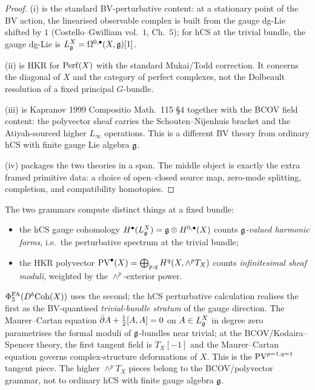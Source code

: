 \begin{proof}
(i) is the standard BV-perturbative content: at a stationary point of
the BV action, the linearised observable complex is built from the
gauge dg-Lie shifted by $1$
(Costello--Gwilliam vol.\ $1$, Ch.\ $5$); for hCS at the trivial
bundle, the gauge dg-Lie is $L_{\mathfrak{g}}^X = \Omega^{0,\bullet}(X,\mathfrak{g})[1]$.

(ii) is HKR for $\mathrm{Perf}(X)$ with the standard Mukai/Todd correction. It
concerns the diagonal of $X$ and the category of perfect complexes, not
the Dolbeault resolution of a fixed principal $G$-bundle.

(iii) is Kapranov 1999 Compositio Math.\ 115 \S$4$ together with the
BCOV field content: the polyvector sheaf carries the
Schouten--Nijenhuis bracket and the Atiyah-sourced higher
$L_\infty$ operations. This is a different BV theory from ordinary hCS
with finite gauge Lie algebra $\mathfrak{g}$.

(iv) packages the two theories in a span. The middle object is exactly
the extra framed primitive data: a choice of open--closed source map,
zero-mode splitting, completion, and compatibility homotopies.
\end{proof}

\begin{remark}
\label{rem:two-grammars-scopes}
The two grammars compute distinct things at a fixed bundle:
\begin{itemize}
\item the hCS gauge cohomology $H^\bullet(L_{\mathfrak{g}}^X) = \mathfrak{g}\otimes
 H^{0,\bullet}(X)$ counts \emph{$\mathfrak{g}$-valued harmonic forms},
 i.e.\ the perturbative spectrum at the trivial bundle;
\item the HKR polyvector $\mathrm{PV}^\bullet(X) = \bigoplus_{p,q}
 H^q(X,\wedge^p T_X)$ counts \emph{infinitesimal sheaf moduli},
 weighted by the $\wedge^p$-exterior power.
\end{itemize}
$\Phi^{\mathrm{FA}}_3(D^b\mathrm{Coh}(X))$ uses the second; the hCS perturbative
calculation realises the first as the BV-quantised
\emph{trivial-bundle stratum} of the gauge direction. The Maurer--Cartan
equation
$\bar\partial A + \tfrac12[A,A] = 0$ on $A\in L_{\mathfrak{g}}^X$ in degree zero
parametrises the formal moduli of $\mathfrak{g}$-bundles near trivial; at
the BCOV/Kodaira--Spencer theory, the first tangent field is
$T_X[-1]$ and the Maurer--Cartan equation governs complex-structure
deformations of $X$. This is the $\mathrm{PV}^{p=1,q=1}$ tangent piece. The
higher $\wedge^pT_X$ pieces belong to the BCOV/polyvector grammar, not
to ordinary hCS with finite gauge algebra $\mathfrak{g}$.
\end{remark}

